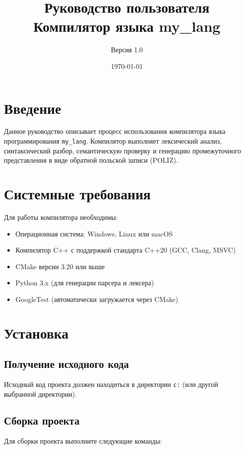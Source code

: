 \documentclass[12pt,a4paper]{article}
\title{Руководство пользователя\\Компилятор языка my\_lang}
\author{Версия 1.0}
\date{\today}
\begin{document}
\maketitle
\tableofcontents
\newpage

\section{Введение}

Данное руководство описывает процесс использования компилятора языка программирования \texttt{my\_lang}. Компилятор выполняет лексический анализ, синтаксический разбор, семантическую проверку и генерацию промежуточного представления в виде обратной польской записи (POLIZ).

\section{Системные требования}

Для работы компилятора необходимы:
\begin{itemize}
    \item Операционная система: Windows, Linux или macOS
    \item Компилятор C++ с поддержкой стандарта C++20 (GCC, Clang, MSVC)
    \item CMake версии 3.20 или выше
    \item Python 3.x (для генерации парсера и лексера)
    \item GoogleTest (автоматически загружается через CMake)
\end{itemize}

\section{Установка}

\subsection{Получение исходного кода}

Исходный код проекта должен находиться в директории \texttt{c:\project} (или другой выбранной директории).

\subsection{Сборка проекта}

Для сборки проекта выполните следующие команды:
\end{document}
